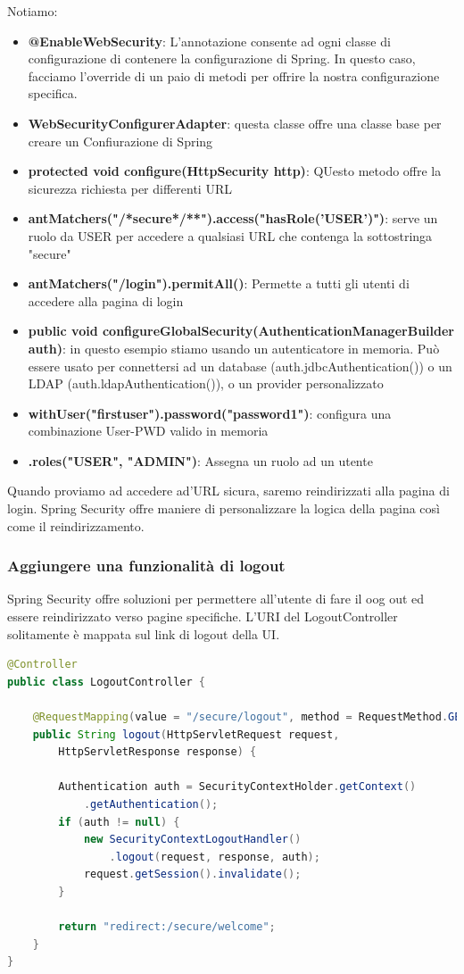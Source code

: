 \documentclass[11pt,a4paper]{book}
\begin{document}
Notiamo:
\begin{itemize}
	\item \textbf{@EnableWebSecurity}: L'annotazione consente ad ogni classe di configurazione di contenere la configurazione di Spring. In questo caso, facciamo l'override di un paio di metodi per offrire la nostra configurazione specifica.
	\item \textbf{WebSecurityConfigurerAdapter}: questa classe offre una classe base per creare un Confiurazione di Spring
	\item \textbf{protected void configure(HttpSecurity http)}: QUesto metodo offre la sicurezza richiesta per differenti URL
	\item \textbf{antMatchers("/*secure*/**").access("hasRole('USER')")}: serve un ruolo da USER per accedere a qualsiasi URL che contenga la sottostringa "secure"
	\item \textbf{antMatchers("/login").permitAll()}: Permette a tutti gli utenti di accedere alla pagina di login
	\item \textbf{public void configureGlobalSecurity(AuthenticationManagerBuilder auth)}: in questo esempio stiamo usando un autenticatore in memoria. Può essere usato per connettersi ad un database (auth.jdbcAuthentication()) o un LDAP (auth.ldapAuthentication()),  o un provider personalizzato
	\item \textbf{withUser("firstuser").password("password1")}: configura una combinazione User-PWD valido in memoria
	\item \textbf{.roles("USER", "ADMIN")}: Assegna un ruolo ad un utente
\end{itemize}

Quando proviamo ad accedere ad'URL sicura, saremo reindirizzati alla pagina di login. Spring Security offre maniere di personalizzare la logica della pagina così come il reindirizzamento. 

\subsubsection{Aggiungere una funzionalità di logout}
Spring Security offre soluzioni per permettere all'utente di fare il oog out ed essere reindirizzato verso pagine specifiche. L'URI del LogoutController solitamente è mappata sul link di logout della UI.
\begin{lstlisting}[language = Java]
@Controller
public class LogoutController {

	@RequestMapping(value = "/secure/logout", method = RequestMethod.GET)
	public String logout(HttpServletRequest request,
		HttpServletResponse response) {
	
		Authentication auth = SecurityContextHolder.getContext()
			.getAuthentication();
		if (auth != null) {
			new SecurityContextLogoutHandler()
				.logout(request, response, auth);
			request.getSession().invalidate();
		}
		
		return "redirect:/secure/welcome";
	}
}
\end{lstlisting}
	
\end{document}
